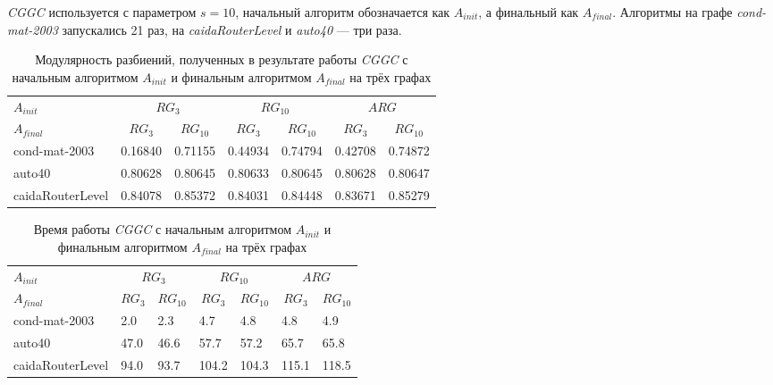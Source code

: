 \emph{CGGC} используется с параметром $s = 10$, начальный алгоритм обозначается как $A_{init}$, а финальный как $A_{final}$. Алгоритмы на графе \emph{cond-mat-2003} запускались 21 раз, на \emph{caidaRouterLevel} и \emph{auto40} --- три раза.

\begin{table}[H]
	\caption{Модулярность разбиений, полученных в результате работы \emph{CGGC} с начальным алгоритмом $A_{init}$ и финальным алгоритмом $A_{final}$ на трёх графах}
	\label{tab:es1-q}
	\begin{tabularx}{\textwidth}{XR{1.5cm}R{1.5cm}R{1.5cm}R{1.5cm}R{1.5cm}R{1.5cm}} \hline
	$A_{init}$	&  &  &  \\
	$A_{final}$ &  &  &  &  &  &  \\\hline
	cond-mat-2003 		& 0.16840	& 0.71155	& 0.44934	& 0.74794	& 0.42708	& 0.74872	\\
	auto40				& 0.80628	& 0.80645	& 0.80633	& 0.80645	& 0.80628	& 0.80647	\\
	caidaRouterLevel	& 0.84078	& 0.85372	& 0.84031	& 0.84448	& 0.83671	& 0.85279	\\\hline
	\end{tabularx}
\end{table}

\begin{table}[H]
	\caption{Время работы \emph{CGGC} с начальным алгоритмом $A_{init}$ и финальным алгоритмом $A_{final}$ на трёх графах}
	\label{tab:es1-t}
	\begin{tabularx}{\textwidth}{XR{1.5cm}R{1.5cm}R{1.5cm}R{1.5cm}R{1.5cm}R{1.5cm}} \hline
	$A_{init}$	&  &  &  \\
	$A_{final}$ &  &  &  &  &  &  \\\hline
	cond-mat-2003 		& 2.0	& 2.3	& 4.7	& 4.8	& 4.8	& 4.9	\\
	auto40				& 47.0	& 46.6	& 57.7	& 57.2	& 65.7	& 65.8	\\
	caidaRouterLevel	& 94.0	& 93.7	& 104.2	& 104.3	& 115.1	& 118.5	\\\hline
	\end{tabularx}
\end{table}

